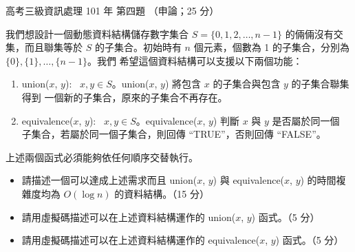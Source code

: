 \begin{pastexam}[label={px:gk3-101-ds-04}]{高考三級資訊處理 101 年 第四題}
（申論；25 分）

我們想設計一個動態資料結構儲存數字集合 $S = \{0, 1, 2, \ldots, n - 1\}$ 的倆倆沒有交集，而且聯集等於
$S$ 的子集合。初始時有 $n$ 個元素，個數為 1 的子集合，分別為 $\{0\}, \{1\}, \ldots, \{n - 1\}$。我們
希望這個資料結構可以支援以下兩個功能：
\begin{enumerate}[label=\textit{\arabic*.}, leftmargin=2.2em, itemsep=1pt]
\item union($x$, $y$): \ $x, y \in S$。union($x$, $y$) 將包含 $x$ 的子集合與包含 $y$ 的子集合聯集得到
一個新的子集合，原來的子集合不再存在。
\item equivalence($x$, $y$): \ $x, y \in S$。equivalence($x$, $y$) 判斷 $x$ 與 $y$ 是否屬於同一個
子集合，若屬於同一個子集合，則回傳 ``TRUE''，否則回傳 ``FALSE''。
\end{enumerate}
上述兩個函式必須能夠依任何順序交替執行。
\begin{itemize}[leftmargin=2em, labelsep=0.3em, itemsep=2pt]
\item[㈠] 請描述一個可以達成上述需求而且 union($x$, $y$) 與 equivalence($x$, $y$) 的時間複雜度均為
$O(\log n)$ 的資料結構。（15 分）
\item[㈡] 請用虛擬碼描述可以在上述資料結構運作的 union($x$, $y$) 函式。（5 分）
\item[㈢] 請用虛擬碼描述可以在上述資料結構運作的 equivalence($x$, $y$) 函式。（5 分）
\end{itemize}
\end{pastexam}

